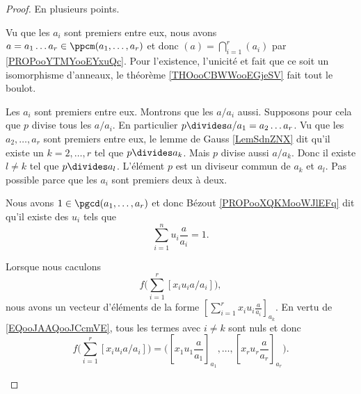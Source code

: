 \begin{proof}
	En plusieurs points.
	\begin{subproof}
		Vu que les \( a_i\) sont premiers entre eux, nous avons \( a=a_1\ldots a_r\in\ppcm(a_1,\ldots,a_r)\) et donc \( (a)=\bigcap_{i=1}^r(a_i)\) par \ref{PROPooYTMYooEYxuQc}. Pour l'existence, l'unicité et fait que ce soit un isomorphisme d'anneaux, le théorème \ref{THOooCBWWooEGjeSV} fait tout le boulot.

		Les \( a_i\) sont premiers entre eux. Montrons que les \( a/a_i\) aussi. Supposons pour cela que \( p\) divise tous les \( a/a_i\). En particulier \( p\divides a/a_1=a_2\dots a_r\). Vu que les \( a_2,\ldots,a_r\) sont premiers entre eux, le lemme de Gauss \ref{LemSdnZNX} dit qu'il existe un \( k=2,\ldots,r\) tel que \( p\divides a_k\). Mais \( p\) divise aussi \( a/a_k\). Donc il existe \( l\neq k\) tel que \( p\divides a_l\). L'élément \( p\) est un diviseur commun de \( a_k\) et \( a_l\). Pas possible parce que les \( a_i\) sont premiers deux à deux.

		Nous avons \( 1\in\pgcd(a_1,\ldots,a_r)\) et donc Bézout \ref{PROPooXQKMooWJlEFq} dit qu'il existe des \( u_i\) tels que
		\begin{equation}	\label{EQooMBGBooKoGKwJ}
			\sum_{i=1}^nu_i\frac{ a }{ a_i }=1.
		\end{equation}

		Lorsque nous caculons
		\begin{equation}
			f\big( \sum_{i=1}^r[x_iu_ia/a_i] \big),
		\end{equation}
		nous avons un vecteur d'éléments de la forme \( [ \sum_{i=1}^rx_iu_i\frac{ a }{ a_i }]_{a_k}\). En vertu de \eqref{EQooJAAQooJCcmVE}, tous les termes avec \( i\neq k\) sont nuls et donc
		\begin{equation}		\label{EQooZBYVooAoUnfM}
			f\big( \sum_{i=1}^r[x_iu_ia/a_i] \big)=\big( [x_1u_1\frac{ a }{ a_1 }]_{a_1},\ldots,[x_ru_r\frac{ a }{ a_r }]_{a_r} \big).
		\end{equation}


\end{subproof}
\end{proof}
